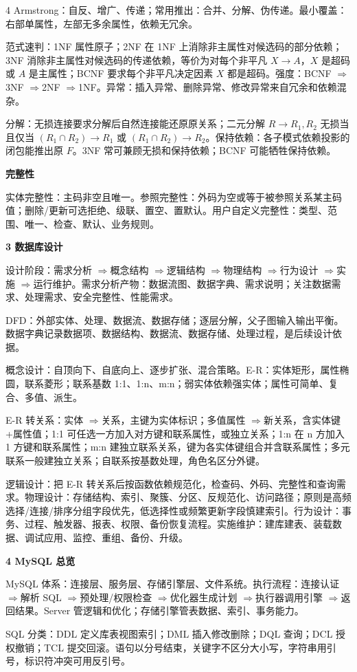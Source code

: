 \documentclass[UTF8]{ctexart}
\newcommand{\blk}[1]{\vspace{0.8pt}\noindent\colorbox{black!10}{\parbox{\dimexpr\linewidth-2\fboxsep}{\bfseries #1}}\vspace{0.6pt}}
\newcommand{\tri}{$\Rightarrow$}
\begin{document}
\begin{multicols*}{4}
Armstrong：自反、增广、传递；常用推出：合并、分解、伪传递。最小覆盖：右部单属性，左部无多余属性，依赖无冗余。

范式速判：1NF 属性原子；2NF 在 1NF 上消除非主属性对候选码的部分依赖；3NF 消除非主属性对候选码的传递依赖，等价为对每个非平凡 $X\to A$，$X$ 是超码或 $A$ 是主属性；BCNF 要求每个非平凡决定因素 $X$ 都是超码。强度：BCNF \tri 3NF \tri 2NF \tri 1NF。异常：插入异常、删除异常、修改异常来自冗余和依赖混杂。

分解：无损连接要求分解后自然连接能还原原关系；二元分解 $R\to R_1,R_2$ 无损当且仅当 $(R_1\cap R_2)\to R_1$ 或 $(R_1\cap R_2)\to R_2$。保持依赖：各子模式依赖投影的闭包能推出原 $F$。3NF 常可兼顾无损和保持依赖；BCNF 可能牺牲保持依赖。

\blk{完整性}
实体完整性：主码非空且唯一。参照完整性：外码为空或等于被参照关系某主码值；删除/更新可选拒绝、级联、置空、置默认。用户自定义完整性：类型、范围、唯一、检查、默认、业务规则。

\blk{3 数据库设计}
设计阶段：需求分析 \tri 概念结构 \tri 逻辑结构 \tri 物理结构 \tri 行为设计 \tri 实施 \tri 运行维护。需求分析产物：数据流图、数据字典、需求说明；关注数据需求、处理需求、安全完整性、性能需求。

DFD：外部实体、处理、数据流、数据存储；逐层分解，父子图输入输出平衡。数据字典记录数据项、数据结构、数据流、数据存储、处理过程，是后续设计依据。

概念设计：自顶向下、自底向上、逐步扩张、混合策略。E-R：实体矩形，属性椭圆，联系菱形；联系基数 1:1、1:n、m:n；弱实体依赖强实体；属性可简单、复合、多值、派生。

E-R 转关系：实体 \tri 关系，主键为实体标识；多值属性 \tri 新关系，含实体键+属性值；1:1 可任选一方加入对方键和联系属性，或独立关系；1:n 在 n 方加入 1 方键和联系属性；m:n 建独立联系关系，键为各实体键组合并含联系属性；多元联系一般建独立关系；自联系按基数处理，角色名区分外键。

逻辑设计：把 E-R 转关系后按函数依赖规范化，检查码、外码、完整性和查询需求。物理设计：存储结构、索引、聚簇、分区、反规范化、访问路径；原则是高频选择/连接/排序分组字段优先，低选择性或频繁更新字段慎建索引。行为设计：事务、过程、触发器、报表、权限、备份恢复流程。实施维护：建库建表、装载数据、调试应用、监控、重组、备份、升级。

\blk{4 MySQL 总览}
MySQL 体系：连接层、服务层、存储引擎层、文件系统。执行流程：连接认证 \tri 解析 SQL \tri 预处理/权限检查 \tri 优化器生成计划 \tri 执行器调用引擎 \tri 返回结果。Server 管逻辑和优化；存储引擎管表数据、索引、事务能力。

SQL 分类：DDL 定义库表视图索引；DML 插入修改删除；DQL 查询；DCL 授权撤销；TCL 提交回滚。语句以分号结束，关键字不区分大小写，字符串用引号，标识符冲突可用反引号。


\end{multicols*}
\end{document}
